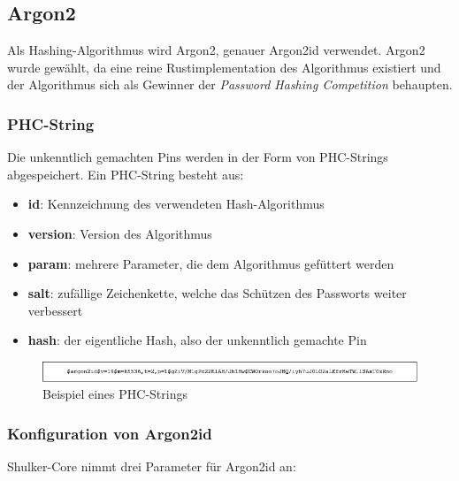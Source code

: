 \subsection{Argon2}
Als Hashing-Algorithmus wird Argon2, genauer Argon2id verwendet. Argon2 wurde gewählt, da eine reine Rustimplementation des Algorithmus
existiert und der Algorithmus sich als Gewinner der \textit{Password Hashing Competition} behaupten.

\subsubsection{PHC-String}
Die unkenntlich gemachten Pins werden in der Form von PHC-Strings abgespeichert. Ein PHC-String besteht aus:
\begin{itemize}
    \item \textbf{id}: Kennzeichnung des verwendeten Hash-Algorithmus
    \item \textbf{version}: Version des Algorithmus
    \item \textbf{param}: mehrere Parameter, die dem Algorithmus gefüttert werden
    \item \textbf{salt}: zufällige Zeichenkette, welche das Schützen des Passworts weiter verbessert
    \item \textbf{hash}: der eigentliche Hash, also der unkenntlich gemachte Pin
\end{itemize}
\begin{figure}[H]
    \begin{center}
        \includegraphics[width=1\textwidth]{images/core/phc_string.png}
        \caption{Beispiel eines PHC-Strings}
    \end{center}
\end{figure}

\subsubsection{Konfiguration von Argon2id}
Shulker-Core nimmt drei Parameter für Argon2id an:


